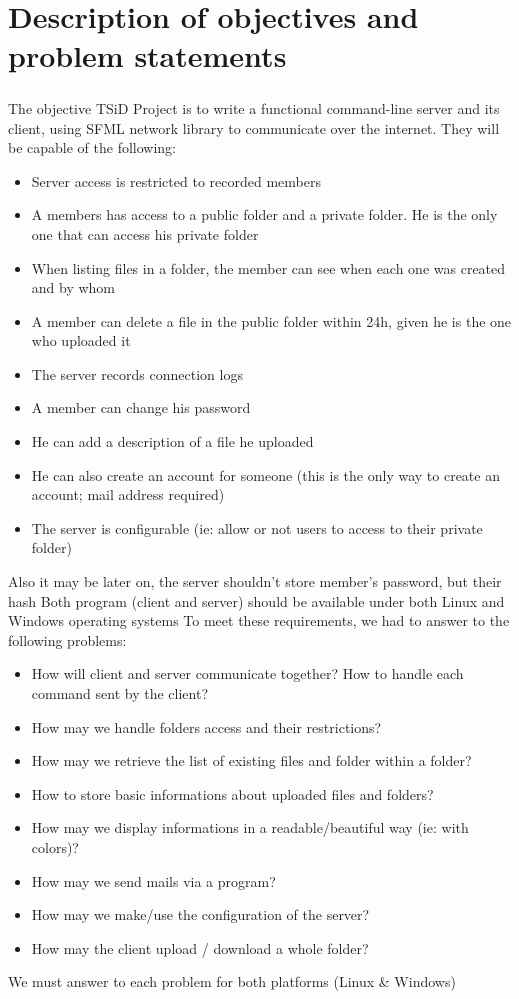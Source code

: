 \documentclass[12pt,a4paper,twoside]{article}
\begin{document}
	\section{Description of objectives and problem statements} %
		\subparagraph*{}
			The objective TSiD Project is to write a functional command-line server and its client, using SFML network library to communicate over the internet.
			They will be capable of the following:
			\begin{itemize}
				\item{} Server access is restricted to recorded members
				\item{} A members has access to a public folder and a private folder. He is the only one that can access his private folder
				\item{} When listing files in a folder, the member can see when each one was created and by whom
				\item{} A member can delete a file in the public folder within 24h, given he is the one who uploaded it
				\item{} The server records connection logs
				\item{} A member can change his password
				\item{} He can add a description of a file he uploaded
				\item{} He can also create an account for someone (this is the only way to create an account; mail address required)
				\item{} The server is configurable (ie: allow or not users to access to their private folder)
			\end{itemize}
			Also it may be later on, the server shouldn't store member's password, but their hash
			Both program (client and server) should be available under both Linux and Windows operating systems
			To meet these requirements, we had to answer to the following problems:
			\begin{itemize}
				\item{} How will client and server communicate together? How to handle each command sent by the client?
				\item{} How may we handle folders access and their restrictions?
				\item{} How may we retrieve the list of existing files and folder within a folder?
				\item{} How to store basic informations about uploaded files and folders?
				\item{} How may we display informations in a readable/beautiful way (ie: with colors)?
				\item{} How may we send mails via a program?
				\item{} How may we make/use the configuration of the server?
				\item{} How may the client upload / download a whole folder?
			\end{itemize}
			We must answer to each problem for both platforms (Linux \& Windows)
\end{document}
